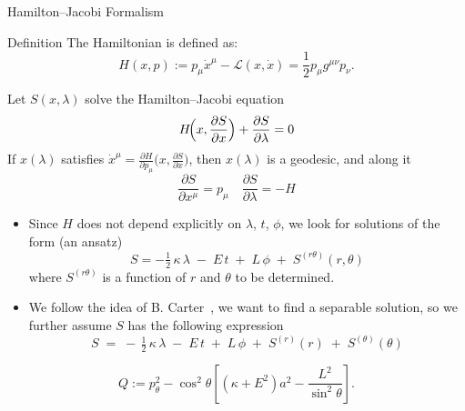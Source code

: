 \documentclass{beamer}
\begin{document}
\begin{frame}{Hamilton–Jacobi Formalism}
  \begin{block}{Definition}
    The Hamiltonian is defined as:
    \[
    H(x,p) := p_{\mu}\dot{x}^{\mu}-\mathcal{L}(x,\dot{x}) = \frac{1}{2}p_{\mu}g^{\mu\nu}p_{\nu}.
    \]
  \end{block}
  
  \begin{theorem}[Jacobi]
    Let $S(x,\lambda)$ solve the Hamilton--Jacobi equation
    \begin{equation}
        H\!\Bigl(x, \frac{\partial S}{\partial x}\Bigr)
        + \frac{\partial S}{\partial \lambda} = 0
    \end{equation}
    If $x(\lambda)$ satisfies $\dot{x}^{\mu} = \frac{\partial H}{\partial p_{\mu}}\bigl(x, \frac{\partial S}{\partial x}\bigr)$, then $x(\lambda)$ is a geodesic, and along it
    \begin{equation}
        \frac{\partial S}{\partial x^{\mu}} = p_{\mu} \quad \frac{\partial S}{\partial \lambda} = -H
    \end{equation}
\end{theorem}
\end{frame}



\begin{frame}{}
    \begin{itemize}
        \item Since $H$ does not depend explicitly on $\lambda$, $t$, $\phi$, we look for solutions of the form (an ansatz)
    \begin{equation}
        S 
        = 
        -\tfrac{1}{2}\,\kappa\,\lambda
        \;-\;
        E\,t
        \;+\;
        L\,\phi
        \;+\;
        S^{(r\theta)}(r,\theta)
    \end{equation}
    where \(S^{(r\theta)}\) is a function of \(r\) and \(\theta\) to be determined.
    \item We follow the idea of B. Carter~\cite{carter}, we want to find a separable solution, so we further assume $S$ has the following expression
    \begin{equation}
        S \;=\; -\,\tfrac12\,\kappa\,\lambda
        \;-\; E\,t
        \;+\; L\,\phi
        \;+\; S^{(r)}(r)
        \;+\; S^{(\theta)}(\theta)
    \end{equation}
    \end{itemize}
    \begin{definition}
    \[
    Q := p_{\theta}^2 - \cos^2 \theta \left[(\kappa + E^2)a^2 - \frac{L^2}{\sin^2 \theta}\right].
    \]
    \end{definition}
\end{frame}
\end{document}
